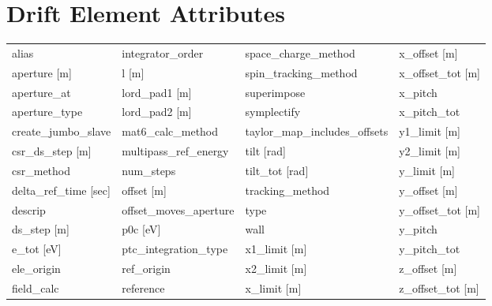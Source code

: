  \section{Drift Element Attributes}
 \label{s:list.drift}
 
 \begin{tabular}{llll} \toprule
alias                            & integrator_order                 & space_charge_method              & x_offset [m]                     \\
aperture [m]                     & l [m]                            & spin_tracking_method             & x_offset_tot [m]                 \\
aperture_at                      & lord_pad1 [m]                    & superimpose                      & x_pitch                          \\
aperture_type                    & lord_pad2 [m]                    & symplectify                      & x_pitch_tot                      \\
create_jumbo_slave               & mat6_calc_method                 & taylor_map_includes_offsets      & y1_limit [m]                     \\
csr_ds_step [m]                  & multipass_ref_energy             & tilt [rad]                       & y2_limit [m]                     \\
csr_method                       & num_steps                        & tilt_tot [rad]                   & y_limit [m]                      \\
delta_ref_time [sec]             & offset [m]                       & tracking_method                  & y_offset [m]                     \\
descrip                          & offset_moves_aperture            & type                             & y_offset_tot [m]                 \\
ds_step [m]                      & p0c [eV]                         & wall                             & y_pitch                          \\
e_tot [eV]                       & ptc_integration_type             & x1_limit [m]                     & y_pitch_tot                      \\
ele_origin                       & ref_origin                       & x2_limit [m]                     & z_offset [m]                     \\
field_calc                       & reference                        & x_limit [m]                      & z_offset_tot [m]                 \\
 \bottomrule
 \end{tabular}
 \vfill
 
